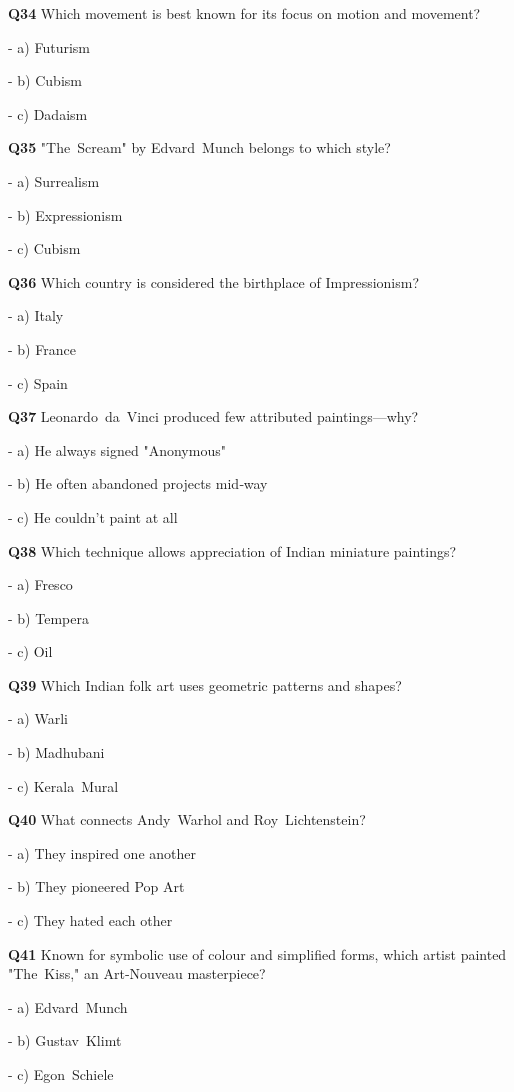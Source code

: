 \textbf{Q34} Which movement is best known for its focus on motion and movement?\par
\quad - a) Futurism\par
\quad - b) Cubism\par
\quad - c) Dadaism\par

\textbf{Q35} "The Scream" by Edvard Munch belongs to which style?\par
\quad - a) Surrealism\par
\quad - b) Expressionism\par
\quad - c) Cubism\par

\textbf{Q36} Which country is considered the birthplace of Impressionism?\par
\quad - a) Italy\par
\quad - b) France\par
\quad - c) Spain\par

\textbf{Q37} Leonardo da Vinci produced few attributed paintings—why?\par
\quad - a) He always signed "Anonymous"\par
\quad - b) He often abandoned projects mid‑way\par
\quad - c) He couldn't paint at all\par

\textbf{Q38} Which technique allows appreciation of Indian miniature paintings?\par
\quad - a) Fresco\par
\quad - b) Tempera\par
\quad - c) Oil\par

\textbf{Q39} Which Indian folk art uses geometric patterns and shapes?\par
\quad - a) Warli\par
\quad - b) Madhubani\par
\quad - c) Kerala Mural\par

\textbf{Q40} What connects Andy Warhol and Roy Lichtenstein?\par
\quad - a) They inspired one another\par
\quad - b) They pioneered Pop Art\par
\quad - c) They hated each other\par

\textbf{Q41} Known for symbolic use of colour and simplified forms, which artist painted "The Kiss," an Art‑Nouveau masterpiece?\par
\quad - a) Edvard Munch\par
\quad - b) Gustav Klimt\par
\quad - c) Egon Schiele\par

